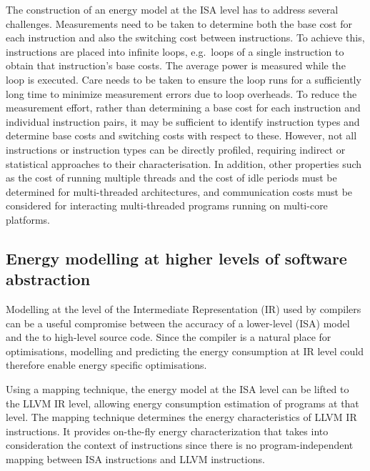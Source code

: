 The construction of an energy model at the ISA level has to address several
challenges.
%
Measurements need to be taken to determine both the base cost for each
instruction and also the switching cost between instructions. To achieve this,
instructions are placed into infinite loops, e.g.\ loops of a single
instruction to obtain that instruction's base costs. The average power is
measured while the loop is executed. Care needs to be taken to ensure the loop
runs for a sufficiently long time to minimize measurement errors due to loop
overheads. 
%
To reduce the measurement effort, rather than determining a base cost for each instruction and individual instruction pairs, it may be sufficient to identify instruction types and determine base costs and switching costs with respect to these. 
%
However, not all instructions or instruction types can be directly profiled,
requiring indirect or statistical approaches to their characterisation. 
%
In addition, other properties such as the cost of running multiple threads and
the cost of idle periods must be determined for multi-threaded architectures, and communication costs must be considered for interacting multi-threaded programs running on multi-core platforms. 


\subsection{Energy modelling at higher levels of software abstraction}
\label{subsec:mapping}

Modelling at the level of the Intermediate Representation (IR) 
used by compilers can be a useful compromise between the accuracy of a lower-level (ISA) 
model and the to high-level source code. Since the compiler is a natural
place for optimisations, modelling and predicting the energy consumption at
IR level could therefore enable energy specific optimisations.

Using a mapping technique, 
the energy model at the ISA level can be lifted to the LLVM IR level, allowing energy
consumption estimation of programs at that level. 
The mapping technique determines the energy characteristics of LLVM IR
instructions. It provides on-the-fly energy characterization that takes into
consideration the context of instructions since there is no program-independent mapping between
ISA instructions and LLVM instructions.

